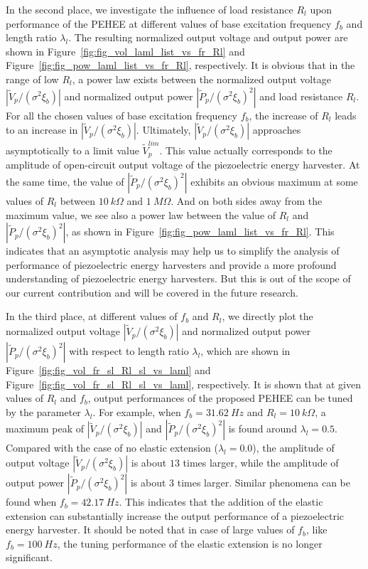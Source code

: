 \documentclass{elsarticle}
\begin{document}
In the second place, we investigate the influence of load resistance $R_l$ upon performance of the PEHEE at different values of base excitation frequency $f_b$ and length ratio $\lambda_l$. The resulting normalized output voltage and output power are shown in Figure~\ref{fig:fig_vol_laml_list_vs_fr_Rl} and Figure~\ref{fig:fig_pow_laml_list_vs_fr_Rl}, respectively. It is obvious that in the range of low $R_l$, a power law exists between the normalized output voltage $|\tilde{V}_p/(\sigma^2 \xi_b)|$ and normalized output power $|\tilde{P}_p/(\sigma^2 \xi_b)^2|$ and load resistance $R_l$. For all the chosen values of base excitation frequency $f_b$, the increase of $R_l$ leads to an increase in $|\tilde{V}_p/(\sigma^2 \xi_b)|$. Ultimately, $|\tilde{V}_p/(\sigma^2 \xi_b)|$ approaches asymptotically to a limit value $\tilde{V}_p^{lim}$. This value actually corresponds to the amplitude of open-circuit output voltage of the piezoelectric energy harvester. At the same time, the value of $|\tilde{P}_p/(\sigma^2 \xi_b)^2|$ exhibits an obvious maximum at some values of $R_l$ between $10\ k\Omega$ and $1\ M\Omega$. And on both sides away from the maximum value, we see also a power law between the value of $R_l$ and $|\tilde{P}_p/(\sigma^2 \xi_b)^2|$, as shown in Figure~\ref{fig:fig_pow_laml_list_vs_fr_Rl}. This indicates that an asymptotic analysis may help us to simplify the analysis of performance of piezoelectric energy harvesters and provide a more profound understanding of piezoelectric energy harvesters. But this is out of the scope of our current contribution and will be covered in the future research.


In the third place, at different values of $f_b$ and $R_l$, we directly plot the normalized output voltage $|\tilde{V}_p/(\sigma^2 \xi_b)|$ and normalized output power $|\tilde{P}_p/(\sigma^2 \xi_b)^2|$ with respect to length ratio $\lambda_l$, which are shown in Figure~\ref{fig:fig_vol_fr_sl_Rl_sl_vs_laml} and Figure~\ref{fig:fig_vol_fr_sl_Rl_sl_vs_laml}, respectively. It is shown that at given values of $R_l$ and $f_b$, output performances of the proposed PEHEE can be tuned by the parameter $\lambda_l$. For example, when $f_b = 31.62\ Hz$ and $R_l = 10\ k\Omega$, a maximum peak of $|\tilde{V}_p/(\sigma^2 \xi_b)|$ and $|\tilde{P}_p/(\sigma^2 \xi_b)^2|$ is found around $\lambda_l = 0.5$. Compared with the case of no elastic extension ($\lambda_l = 0.0$), the amplitude of output voltage $|\tilde{V}_p/(\sigma^2 \xi_b)|$ is about $13$ times larger, while the amplitude of output power $|\tilde{P}_p/(\sigma^2 \xi_b)^2|$ is about $3$ times larger. Similar phenomena can be found when $f_b = 42.17\ Hz$. This indicates that the addition of the elastic extension can substantially increase the output performance of a piezoelectric energy harvester. It should be noted that in  case of large values of $f_b$, like $f_b = 100\ Hz$, the tuning performance of the elastic extension is no longer significant.
\end{document}

